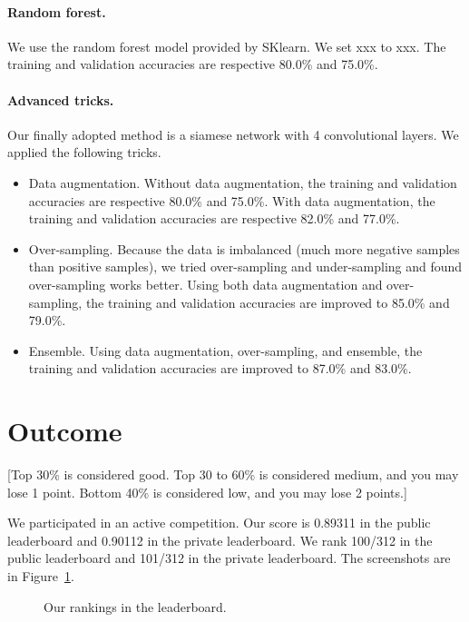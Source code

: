 \documentclass[11pt]{article}
\numberwithin{equation}{section}
\begin{document}
\paragraph{Random forest.}
We use the random forest model provided by SKlearn.
We set xxx to xxx.
The training and validation accuracies are respective 80.0\% and 75.0\%.




\paragraph{Advanced tricks.}
Our finally adopted method is a siamese network with 4 convolutional layers.
We applied the following tricks.
\begin{itemize}
	\item 
	Data augmentation.
	Without data augmentation, the training and validation accuracies are respective 80.0\% and 75.0\%.
	With data augmentation, the training and validation accuracies are respective 82.0\% and 77.0\%.
	\item 
	Over-sampling.
	Because the data is imbalanced (much more negative samples than positive samples),
	we tried over-sampling and under-sampling and found over-sampling works better.
	Using both data augmentation and over-sampling, the training and validation accuracies are improved to 85.0\% and 79.0\%.
	\item
	Ensemble.
	Using data augmentation, over-sampling, and ensemble, the training and validation accuracies are improved to 87.0\% and 83.0\%.
\end{itemize}



\section{Outcome}

[Top 30\% is considered good.
Top 30 to 60\% is considered medium, and you may lose 1 point.
Bottom 40\% is considered low, and you may lose 2 points.]


We participated in an active competition.
Our score is 0.89311 in the public leaderboard and 0.90112 in the private leaderboard.
We rank 100/312 in the public leaderboard and 101/312 in the private leaderboard.
The screenshots are in Figure~\ref{fig:leaderboard}.





\begin{figure}
	\begin{center}
	\end{center}
	\caption{Our rankings in the leaderboard.}
	\label{fig:leaderboard}
\end{figure}
\end{document}
